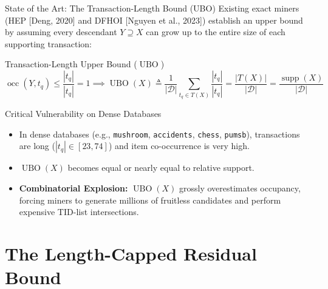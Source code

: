 \documentclass[aspectratio=169,10pt]{beamer}
\newcommand{\HEP}{\textsc{HEP}}
\newcommand{\DFHOI}{\textsc{DFHOI}}
\newcommand{\supp}{\operatorname{supp}}
\newcommand{\occ}{\operatorname{occ}}
\newcommand{\UBO}{\operatorname{UBO}}
\begin{document}
\begin{frame}{State of the Art: The Transaction-Length Bound (UBO)}
  Existing exact miners (\HEP{} [Deng, 2020] and \DFHOI{} [Nguyen et al., 2023]) establish an upper bound by assuming every descendant $Y \supseteq X$ can grow up to the entire size of each supporting transaction:
  
  \begin{block}{Transaction-Length Upper Bound ($\UBO$)}
    $$\occ(Y, t_q) \le \frac{|t_q|}{|t_q|} = 1 \implies \UBO(X) \triangleq \frac{1}{|\mathcal{D}|} \sum_{t_q \in T(X)} \frac{|t_q|}{|t_q|} = \frac{|T(X)|}{|\mathcal{D}|} = \frac{\supp(X)}{|\mathcal{D}|}$$
  \end{block}

  \begin{alertblock}{Critical Vulnerability on Dense Databases}
    \begin{itemize}
      \item In dense databases (e.g., \texttt{mushroom}, \texttt{accidents}, \texttt{chess}, \texttt{pumsb}), transactions are long ($|t_q| \in [23, 74]$) and item co-occurrence is very high.
      \item $\UBO(X)$ becomes equal or nearly equal to relative support.
      \item \textbf{Combinatorial Explosion:} $\UBO(X)$ grossly overestimates occupancy, forcing miners to generate millions of fruitless candidates and perform expensive TID-list intersections.
    \end{itemize}
  \end{alertblock}
\end{frame}

\section{The Length-Capped Residual Bound}
\end{document}
